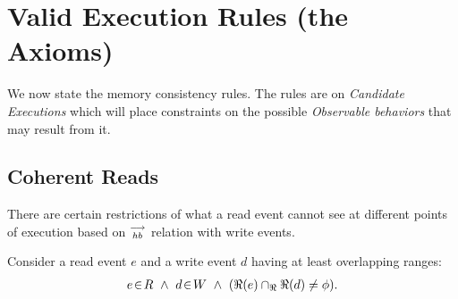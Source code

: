         
    \section{Valid Execution Rules (the Axioms)}
        We now state the memory consistency rules. The rules are on \textit{Candidate Executions} which will place constraints on the possible \textit{Observable behaviors} that may result from it. 
         
        \subsection{Coherent Reads} 
        
            There are certain restrictions of what a read event cannot see at different points of execution based on $\stackrel{\longrightarrow}{_{hb}}$ relation with write events. 

            Consider a read event $e$ and a write event $d$ having at least overlapping ranges:
            \begin{align*}
                \event{e}{R} \ \wedge \ 
                \event{d}{W} \ \wedge \
                (\Re(e) \cap_\Re \Re(d) \neq \phi).
            \end{align*}


